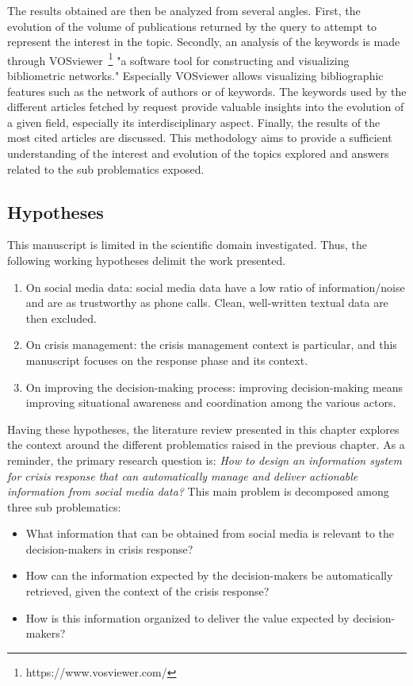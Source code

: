 The results obtained are then be analyzed from several angles.
First, the evolution of the volume of publications returned by the query to attempt to represent the interest in the topic.
Secondly, an analysis of the keywords is made through VOSviewer~\footnote{https://www.vosviewer.com/} "a software tool for constructing and visualizing bibliometric networks."
Especially VOSviewer allows visualizing bibliographic features such as the network of authors or of keywords.
The keywords used by the different articles fetched by request provide valuable insights into the evolution of a given field, especially its interdisciplinary aspect.
Finally, the results of the most cited articles are discussed.
This methodology aims to provide a sufficient understanding of the interest and evolution of the topics explored and answers related to the sub problematics exposed.

\subsection*{Hypotheses}
This manuscript is limited in the scientific domain investigated.
Thus, the following working hypotheses delimit the work presented.

\begin{enumerate}
    \item On social media data: social media data have a low ratio of information/noise and are as trustworthy as phone calls.
          Clean, well-written textual data are then excluded.
    \item On crisis management: the crisis management context is particular, and this manuscript focuses on the response phase and its context.
    \item On improving the decision-making process: improving decision-making means improving situational awareness and coordination among the various actors.
\end{enumerate}

Having these hypotheses, the literature review presented in this chapter explores the context around the different problematics raised in the previous chapter.
As a reminder, the primary research question is: \emph{How to design an information system for crisis response that can automatically manage and deliver actionable information from social media data?}
This main problem is decomposed among three sub problematics:

\begin{itemize}
    \item What information that can be obtained from social media is relevant to the decision-makers in crisis response?
    \item How can the information expected by the decision-makers be automatically retrieved, given the context of the crisis response?
    \item How is this information organized to deliver the value expected by decision-makers?
\end{itemize}

